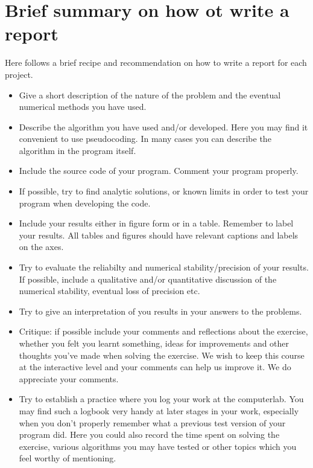 \documentclass[10pt]{article}
\begin{document}
\section*{Brief summary on how ot write a report}

Here follows a brief recipe and recommendation on how to write a report for each
project.
\begin{itemize}
\item Give a short description of the nature of the problem and the eventual 
numerical methods you have used.
\item Describe the algorithm you have used and/or developed. Here you may find it convenient
to use pseudocoding. In many cases you can describe the algorithm
in the program itself.

\item Include the source code of your program. Comment your program properly.
\item If possible, try to find analytic solutions, or known limits
in order to test your program when developing the code.
\item Include your results either in figure form or in a table. Remember to
       label your results. All tables and figures should have relevant captions
       and labels on the axes.
\item Try to evaluate the reliabilty and numerical stability/precision
of your results. If possible, include a qualitative and/or quantitative
discussion of the numerical stability, eventual loss of precision etc. 

\item Try to give an interpretation of you results in your answers to 
the problems.
\item Critique: if possible include your comments and reflections about the 
exercise, whether you felt you learnt something, ideas for improvements and 
other thoughts you've made when solving the exercise.
We wish to keep this course at the interactive level and your comments can help
us improve it. We do appreciate your comments. 
\item Try to establish a practice where you log your work at the 
computerlab. You may find such a logbook very handy at later stages
in your work, especially when you don't properly remember 
what a previous test version 
of your program did. Here you could also record 
the time spent on solving the exercise, various algorithms you may have tested
or other topics which you feel worthy of mentioning.
\end{itemize}
\end{document}
